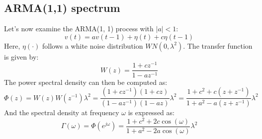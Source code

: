 \subsection{ARMA(1,1) spectrum}
Let's now examine the ARMA(1, 1) process with $\left\lvert a \right\rvert  < 1$:
\[v(t)=av(t-1)+\eta(t)+c\eta(t-1)\]
Here, $\eta(\cdot)$ follows a white noise distribution $WN(0,\lambda^2)$. 
The transfer function is given by:
\[W(z)=\dfrac{1+cz^{-1}}{1-az^{-1}}\]
The power spectral density can then be computed as:
\[\Phi(z)=W(z)W(z^{-1})\lambda^2=\dfrac{\left(1+cz^{-1}\right)\left(1+cz\right)}{\left(1-az^{-1}\right)\left(1-az\right)}\lambda^2=\dfrac{1+c^2+c(z+z^{-1})}{1+a^2-a(z+z^{-1})}\lambda^2\]
And the spectral density at frequency $\omega$ is expressed as:
\[\Gamma(\omega)=\Phi(e^{j\omega})=\dfrac{1+c^2+2c\cos(\omega)}{1+a^2-2a\cos(\omega)}\lambda^2\]